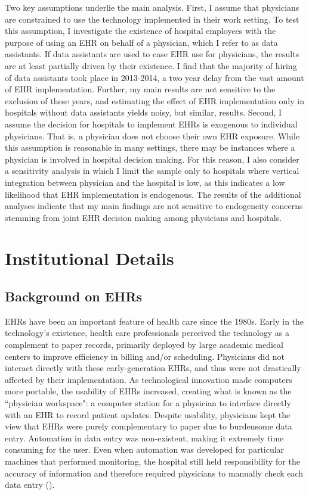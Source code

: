 \documentclass[12pt]{article}
\begin{document}
Two key assumptions underlie the main analysis. First, I assume that physicians are constrained to use the technology implemented in their work setting. To test this assumption, I investigate the existence of hospital employees with the purpose of using an EHR on behalf of a physician, which I refer to as data assistants. If data assistants are used to ease EHR use for physicians, the results are at least partially driven by their existence. I find that the majority of hiring of data assistants took place in 2013-2014, a two year delay from the vast amount of EHR implementation. Further, my main results are not sensitive to the exclusion of these years, and estimating the effect of EHR implementation only in hospitals without data assistants yields noisy, but similar, results. Second, I assume the decision for hospitals to implement EHRs is exogenous to individual physicians. That is, a physician does not choose their own EHR exposure. While this assumption is reasonable in many settings, there may be instances where a physician is involved in hospital decision making. For this reason, I also consider a sensitivity analysis in which I limit the sample only to hospitals where vertical integration between physician and the hospital is low, as this indicates a low likelihood that EHR implementation is endogenous. The results of the additional analyses indicate that my main findings are not sensitive to endogeneity concerns stemming from joint EHR decision making among physicians and hospitals.







\section{Institutional Details}

\subsection{Background on EHRs}
EHRs have been an important feature of health care since the 1980s. Early in the technology's existence, health care professionals perceived the technology as a complement to paper records, primarily deployed by large academic medical centers to improve efficiency in billing and/or scheduling. Physicians did not interact directly with these early-generation EHRs, and thus were not drastically affected by their implementation. As technological innovation made computers more portable, the usability of EHRs increased, creating what is known as the ``physician workspace": a computer station for a physician to interface directly with an EHR to record patient updates. Despite usability, physicians kept the view that EHRs were purely complementary to paper due to burdensome data entry. Automation in data entry was non-existent, making it extremely time consuming for the user. Even when automation was developed for particular machines that performed monitoring, the hospital still held responsibility for the accuracy of information and therefore required physicians to manually check each data entry (\cite{evans2016electronic}). 
\end{document}
